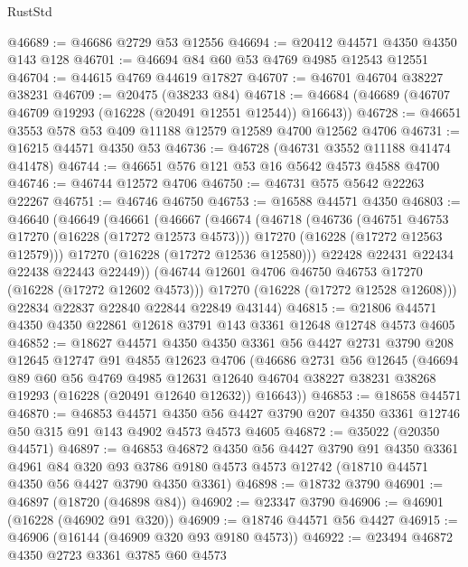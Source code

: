 \begin{lexlean}{RustStd}
\begin{coremodule}
@46689 := @46686 @2729 @53 @12556
@46694 := @20412 @44571 @4350 @4350 @143 @128
@46701 := @46694 @84 @60 @53 @4769 @4985 @12543 @12551
@46704 := @44615 @4769 @44619 @17827
@46707 := @46701 @46704 @38227 @38231
@46709 := @20475 (@38233 @84)
@46718 := @46684 (@46689 (@46707 @46709 @19293 (@16228 (@20491 @12551 @12544)) @16643))
@46728 := @46651 @3553 @578 @53 @409 @11188 @12579 @12589 @4700 @12562 @4706
@46731 := @16215 @44571 @4350 @53
@46736 := @46728 (@46731 @3552 @11188 @41474 @41478)
@46744 := @46651 @576 @121 @53 @16 @5642 @4573 @4588 @4700
@46746 := @46744 @12572 @4706
@46750 := @46731 @575 @5642 @22263 @22267
@46751 := @46746 @46750
@46753 := @16588 @44571 @4350
@46803 := @46640
    (@46649
      (@46661
        (@46667
          (@46674
            (@46718
              (@46736
                (@46751 @46753 @17270 (@16228 (@17272 @12573 @4573)))
                @17270
                (@16228 (@17272 @12563 @12579)))
              @17270
              (@16228 (@17272 @12536 @12580)))
            @22428
            @22431
            @22434
            @22438
            @22443
            @22449))
        (@46744 @12601 @4706 @46750 @46753 @17270 (@16228 (@17272 @12602 @4573)))
        @17270
        (@16228 (@17272 @12528 @12608)))
      @22834
      @22837
      @22840
      @22844
      @22849
      @43144)
@46815 := @21806 @44571 @4350 @4350 @22861 @12618 @3791 @143 @3361 @12648 @12748 @4573 @4605
@46852 := @18627
    @44571
    @4350
    @4350
    @3361
    @56
    @4427
    @2731
    @3790
    @208
    @12645
    @12747
    @91
    @4855
    @12623
    @4706
    (@46686
      @2731
      @56
      @12645
      (@46694
        @89
        @60
        @56
        @4769
        @4985
        @12631
        @12640
        @46704
        @38227
        @38231
        @38268
        @19293
        (@16228 (@20491 @12640 @12632))
        @16643))
@46853 := @18658 @44571
@46870 := @46853
    @44571
    @4350
    @56
    @4427
    @3790
    @207
    @4350
    @3361
    @12746
    @50
    @315
    @91
    @143
    @4902
    @4573
    @4573
    @4605
@46872 := @35022 (@20350 @44571)
@46897 := @46853
    @46872
    @4350
    @56
    @4427
    @3790
    @91
    @4350
    @3361
    @4961
    @84
    @320
    @93
    @3786
    @9180
    @4573
    @4573
    @12742
    (@18710 @44571 @4350 @56 @4427 @3790 @4350 @3361)
@46898 := @18732 @3790
@46901 := @46897 (@18720 (@46898 @84))
@46902 := @23347 @3790
@46906 := @46901 (@16228 (@46902 @91 @320))
@46909 := @18746 @44571 @56 @4427
@46915 := @46906 (@16144 (@46909 @320 @93 @9180 @4573))
@46922 := @23494 @46872 @4350 @2723 @3361 @3785 @60 @4573

\end{coremodule}
\end{lexlean}

